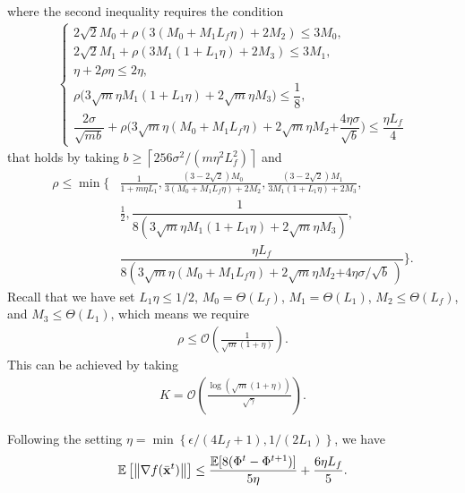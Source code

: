 \documentclass[sigconf]{acmart}
\newcommand{\Norm}[1]{\left\| #1 \right\|}
\def\vx{{\bf{x}}}
\def\fO{{\mathcal{O}}}
\def\BE{{\mathbb{E}}}
\theoremstyle{plain}
\def\bx{{\bar\vx}}
\begin{document}
where the second inequality requires the condition
\begin{align*}
\begin{cases}    
 2\sqrt{2}M_0 + \rho(3(M_0 + M_1L_f\eta) + 2 M_2) \leq 3M_0,\\[0.1cm]
 2\sqrt{2}M_1 + \rho\left(3 M_1(1 + L_1\eta) + 2 M_3\right) \leq 3M_1, \\[0.1cm]
 \eta + 2\rho\eta \leq 2\eta,  \\[0.15cm]
 \rho\Big(3\sqrt{m}\eta M_1(1 + L_1\eta) + 2\sqrt{m}\eta M_3\Big) \leq \dfrac{1}{8}, \\[0.25cm]
 \dfrac{2\sigma}{\sqrt{mb}}  + \rho\Big(3\sqrt{m}\eta(M_0 + M_1L_f\eta) + 2\sqrt{m}\eta M_2 {+\dfrac{4\eta\sigma}{\sqrt{b}}}\Big) \leq \dfrac{\eta L_f}{4}
\end{cases}
\end{align*}
that holds by taking $b\geq\left\lceil {256\sigma^2}/(m\eta^2L_f^2)\right\rceil$
and 
\begin{align*}    
\rho \leq \min\Bigg\{&\frac{1}{1+m \eta L_1},
  \frac{(3-2\sqrt{2})M_0}{3(M_0 + M_1L_f\eta) + 2 M_2}, \frac{(3-2\sqrt{2})M_1}{3 M_1(1 + L_1\eta) + 2 M_3},\\
  &  \frac{1}{2}, \dfrac{1}{8(3\sqrt{m}\eta M_1(1 + L_1\eta) + 2\sqrt{m}\eta M_3)}, \\
 & \dfrac{\eta L_f}{8(3\sqrt{m}\eta(M_0 + M_1L_f\eta) + 2\sqrt{m}\eta M_2{+{4\eta\sigma}/{\sqrt{b}}\,})} \Bigg\}.
\end{align*}
Recall that we have set
$L_1\eta \leq 1/2$, $M_0=\Theta(L_f)$, $M_1=\Theta(L_1)$, $M_2\leq \Theta(L_f)$, and $M_3\leq \Theta(L_1)$,
which means we require 
\begin{align*}    
\rho \leq \fO\left(\frac{1}{{\sqrt{m}(1+\eta)}}\right).
\end{align*}
This can be achieved by taking  
\begin{align*}
K=\fO\left(\frac{\log{{(\sqrt{m}(1+\eta))}}}{\sqrt{\gamma}}\right).    
\end{align*}


Following the setting $\eta = \min\left\{\epsilon/(4L_f+1), 1/(2L_1)\right\}$, we have
\begin{align*}    
\BE\left[\Norm{\nabla f(\bx^t)}\right]
\leq \frac{\BE[8(\Phi^t - \Phi^{t+1})]}{5\eta}  + \frac{6\eta L_f}{5}.
\end{align*}
\end{document}
